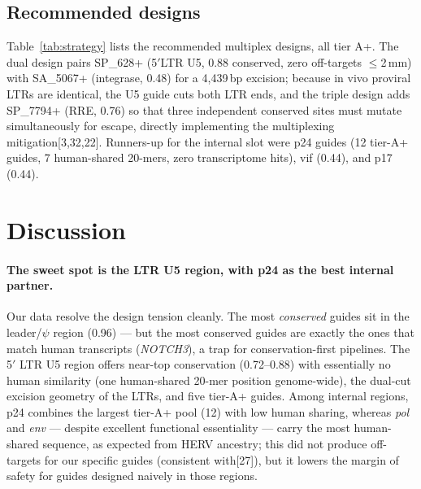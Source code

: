 \documentclass[11pt]{article}
\newcommand{\src}[1]{[#1]}
\begin{document}
\subsection{Recommended designs}
\label{sec:strategy}
Table~\ref{tab:strategy} lists the recommended multiplex designs, all
tier A+. The dual design pairs SP\_628+ (5$'$LTR U5, 0.88 conserved, zero
off-targets $\le$2\,mm) with SA\_5067+ (integrase, 0.48) for a 4,439\,bp
excision; because in vivo proviral LTRs are identical, the U5 guide cuts
both LTR ends, and the triple design adds SP\_7794+ (RRE, 0.76) so that
three independent conserved sites must mutate simultaneously for escape,
directly implementing the multiplexing mitigation\src{3,32,22}. Runners-up
for the internal slot were p24 guides (12 tier-A+ guides, 7 human-shared
20-mers, zero transcriptome hits), vif (0.44), and p17 (0.44).

\begin{table}[ht]\centering\small
\caption{Recommended tier-A+ guide combinations (protospacer/PAM as read on
the PAM-bearing strand). Cons.\ = fraction of 25 strains with the guide site
unmutated.}
\label{tab:strategy}

\end{table}

\begin{table}[ht]\centering\small
\caption{Top tier-A+ guides by conservation. Full tables for all 190 guides,
including every off-target site and its coordinate, are in the repository.}
\label{tab:topguides}

\end{table}

\section{Discussion}

\paragraph{The sweet spot is the LTR U5 region, with p24 as the best
internal partner.} Our data resolve the design tension cleanly. The most
\emph{conserved} guides sit in the leader/$\psi$ region (0.96) --- but the
most conserved guides are exactly the ones that match human transcripts
(\emph{NOTCH3}), a trap for conservation-first pipelines. The 5$'$ LTR U5
region offers near-top conservation (0.72--0.88) with essentially no human
similarity (one human-shared 20-mer position genome-wide), the dual-cut
excision geometry of the LTRs, and five tier-A+ guides. Among internal
regions, p24 combines the largest tier-A+ pool (12) with low human sharing,
whereas \emph{pol} and \emph{env} --- despite excellent functional
essentiality --- carry the most human-shared sequence, as expected from
HERV ancestry; this did not produce off-targets for our specific guides
(consistent with\src{27}), but it lowers the margin of safety for guides
designed naively in those regions.
\end{document}
